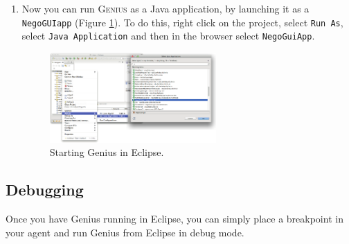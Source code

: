 \documentclass[]{article}
\begin{document}
\begin{enumerate}
    
\item Now you can run G\textsc{enius} as a Java application, by launching it as a \texttt{NegoGUIapp} (Figure \ref{fig:startgenius}). To do this, right click on the project, select \texttt{Run As}, select \texttt{Java Application} and then in the browser select \texttt{NegoGuiApp}.

\begin{figure}[h!]
	\centering
		\includegraphics[width=0.6\textwidth]{media/startup.pdf}
		\caption{Starting Genius in Eclipse.}
	\label{fig:startgenius}
\end{figure}
\end{enumerate}

\FloatBarrier


\subsection{Debugging}
Once you have Genius running in Eclipse, you can simply place a breakpoint in your agent and run Genius from Eclipse in debug mode.




\end{document}
